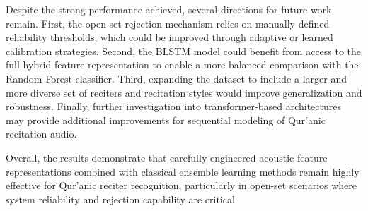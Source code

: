 \documentclass[conference]{IEEEtran}
\begin{document}
Despite the strong performance achieved, several directions for future work remain. First, the open-set rejection mechanism relies on manually defined reliability thresholds, which could be improved through adaptive or learned calibration strategies. Second, the BLSTM model could benefit from access to the full hybrid feature representation to enable a more balanced comparison with the Random Forest classifier. Third, expanding the dataset to include a larger and more diverse set of reciters and recitation styles would improve generalization and robustness. Finally, further investigation into transformer-based architectures may provide additional improvements for sequential modeling of Qur'anic recitation audio.

Overall, the results demonstrate that carefully engineered acoustic feature representations combined with classical ensemble learning methods remain highly effective for Qur'anic reciter recognition, particularly in open-set scenarios where system reliability and rejection capability are critical.

\balance
\fontsize{11}{13}\selectfont
\printbibliography
\end{document}
